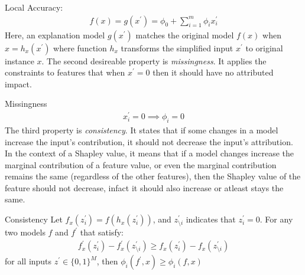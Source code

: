 \documentclass[english]{tktltiki2}
\theoremstyle{definition}
\theoremstyle{remark}
\begin{document}
\begin{properties} \label{prop:all_properties}
\item Local Accuracy:
\begin{align*}
	f(x) = g(x^\prime) =  \phi_0 + \sum_{i=1}^{m} \phi_i x_i^\prime 
\end{align*}
Here, an explanation model $g(x^\prime)$ matches the original model $f(x)$ when $x = h_x(x^\prime)$ where function $h_x$ transforms the simplified input $x^\prime$ to original instance $x$.
The second desireable property is \textit{missingness}. It applies the constraints to features that when $x^\prime = 0$ then it should have no attributed impact.
\item Missingness
\begin{align*}
	x_i^\prime = 0 \implies \phi_i = 0
\end{align*}
The third property is \textit{consistency}. It states that if some changes in a model increase the input's contribution, it should not decrease the input's attribution. In the context of a Shapley value, it means that if a model changes increase the marginal contribution of a feature value, or even the marginal contribution remains the same (regardless of the other features), then the Shapley value of the feature should not decrease, infact it should also increase or atleast stays the same.

\item Consistency
Let $f_x(z_i^\prime) = f(h_x(z_i^\prime))$, and $z^\prime_{\setminus i}$ indicates that $z^\prime_i = 0$. For any two models $f$ and $f^\prime$ that satisfy:
\begin{align*}
	f^\prime_x(z_i^\prime) - f^\prime_x(z^\prime_{\setminus i}) \geq f_x(z_i^\prime) - f_x(z^\prime_{\setminus i})
\end{align*}
for all inputs $z^\prime \in \{0,1\}^{M}$, then $\phi_i(f^\prime, x) \geq \phi_i(f, x)$
\end{properties}
\end{document}
